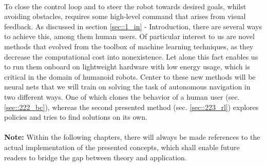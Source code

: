 \\
To close the control loop and to steer the robot towards desired goals, whilst avoiding obstacles, requires some high-level command that arises from visual feedback. As discussed in section \ref{sec::1_in} - Introduction, there are several ways to achieve this, among them human users. Of particular interest to us are novel methods that evolved from the toolbox of machine learning techniques, as they decrease the computational cost into nonexistence. Let alone this fact enables us to run them onboard on lightweight hardware with low energy usage, which is critical in the domain of humanoid robots. Center to these new methods will be neural nets that we will train on solving the task of autonomous navigation in two different ways. One of which clones the behavior of a human user (sec. \ref{sec::222_bc}), whereas the second presented method (sec. \ref{sec::223_rl}) explores policies and tries to find solutions on its own.
\\\\
\textbf{Note:} Within the following chapters, there will always be made references to the actual implementation of the presented concepts, which shall enable future readers to bridge the gap between theory and application.